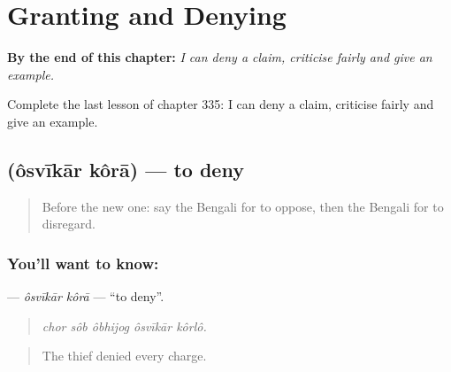 
\chapter{Granting and Denying}
\label{ch:bn-granting-and-denying}

\begin{chapteropening}
\textbf{By the end of this chapter:} \emph{I can deny a claim, criticise fairly and give an example.}

Complete the last lesson of chapter 335: I can deny a claim, criticise fairly and give an example.
\end{chapteropening}

\section[\texorpdfstring{\bn{অস্বীকার} \bn{করা} (ôsvīkār kôrā)}{অস্বীকার করা (ôsvīkār kôrā)}]{  (ôsvīkār kôrā) — to deny}

\label{lesson:BN-C335-osvikar-kora}



\begin{quote}
Before the new one: say the Bengali for to oppose, then the Bengali for to disregard.
\end{quote}

\subsection*{You'll want to know:  }
\textbf{ } — \emph{ôsvīkār kôrā} — \textquotedblleft{}to deny\textquotedblright{}.

\begin{quote}
    
\end{quote}

\begin{quote}
\emph{chor sôb ôbhijog ôsvīkār kôrlô.}
\end{quote}

\begin{quote}
The thief denied every charge.
\end{quote}

